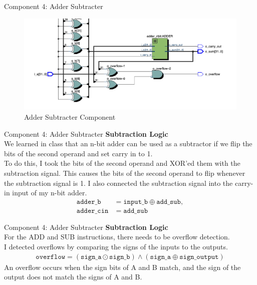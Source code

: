 \documentclass{beamer}
\begin{document}
\begin{frame}{Component 4: Adder Subtracter}
\begin{figure}[ht]
  \centering
  \includegraphics[width=\textwidth]{./images/adder_subtracter.png}
  \caption{Adder Subtracter Component}
\end{figure}
\end{frame}
\begin{frame}{Component 4: Adder Subtracter}
    \textbf{Subtraction Logic} \\
    We learned in class that an n-bit adder can be used as a subtractor if we flip the bits of the second operand and set carry in to 1. \\
To do this, I took the bits of the second operand and XOR'ed them with the subtraction signal. This causes the bits of the second operand to flip whenever the subtraction signal is 1. I also connected the subtraction signal into the carry-in input of my n-bit adder.
\begin{align*}
\mathtt{adder\_b} &= \mathtt{input\_b} \oplus \mathtt{add\_sub}, \\
\mathtt{adder\_cin} &= \mathtt{add\_sub}
\end{align*}
\end{frame}
\begin{frame}{Component 4: Adder Subtracter}
    \textbf{Subtraction Logic} \\
    For the ADD and SUB instructions, there needs to be overflow detection.\\
    I detected overflows by comparing the signs of the inputs to the outputs.
    \begin{align*}
    \mathtt{overflow} = (\mathtt{sign\_a} \odot \mathtt{sign\_b}) \land (\mathtt{sign\_a} \oplus \mathtt{sign\_output})
    \end{align*} 
    An overflow occurs when the sign bits of A and B match, and the sign of the output does not match the signs of A and B.
\end{frame}
\end{document}
